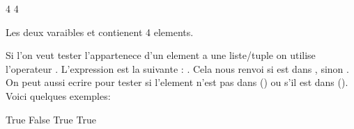 \documentclass[letterpaper,10pt,french]{sphinxmanual}
\begin{document}
\begin{sphinxVerbatim}[commandchars=\\\{\}]
4
4
\end{sphinxVerbatim}

\sphinxAtStartPar
Les deux varaibles  et  contienent 4 elements.

\sphinxAtStartPar
Si l’on veut tester l’appartenece d’un element a une liste/tuple on utilise l’operateur . L’expression est la suivante : . Cela nous renvoi  si est dans , sinon . On peut aussi ecrire  pour tester si l’element n’est pas dans  () ou s’il est dans  (). Voici quelques exemples:

\begin{sphinxVerbatim}[commandchars=\\\{\}]
  \PYG{p}{[}   \PYG{p}{]}

  

  

   

   
\end{sphinxVerbatim}

\begin{sphinxVerbatim}[commandchars=\\\{\}]
True
False
True
True
\end{sphinxVerbatim}
\end{document}
